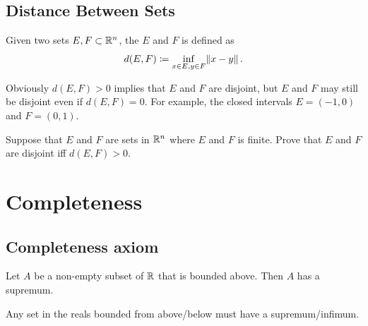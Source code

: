\subsection{Distance Between Sets}
\begin{definition}
Given two sets $E,F\subset\mathbb R^n$, the  $E$ and $F$ is defined as
\[ d(E,F)\coloneqq\inf_{x\in E,y\in F}\norm{x-y}. \]
\end{definition}

Obviously $d(E,F)>0$ implies that $E$ and $F$ are disjoint, but $E$ and $F$ may still be disjoint even if $d(E,F)=0$. For example, the closed intervals $E=(-1,0)$ and $F=(0,1)$.

\begin{exercise}
Suppose that $E$ and $F$ are sets in $\mathbb R^n$ where $E$ and $F$ is finite. Prove that $E$ and $F$ are disjoint iff $d(E,F)>0$.
\end{exercise}
\pagebreak

\section{Completeness}
\subsection{Completeness axiom}
\begin{theorem}
Let $A$ be a non-empty subset of $\mathbb R$ that is bounded above. Then $A$ has a supremum.
\end{theorem}

Any set in the reals bounded from above/below must have a supremum/infimum.

